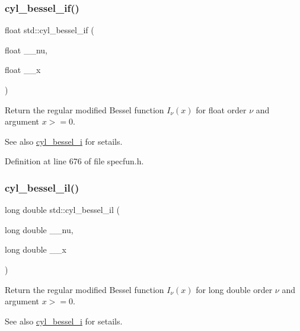 \subsubsection{\texorpdfstring{cyl\+\_\+bessel\+\_\+if()}{cyl\_bessel\_if()}}
{\footnotesize\ttfamily float std\+::cyl\+\_\+bessel\+\_\+if (\begin{DoxyParamCaption}\item[{float}]{\+\_\+\+\_\+nu,  }\item[{float}]{\+\_\+\+\_\+x }\end{DoxyParamCaption})\hspace{0.3cm}{\ttfamily [inline]}}

Return the regular modified Bessel function $ I_{\nu}(x) $ for {\ttfamily float} order $ \nu $ and argument $ x >= 0 $.

\begin{DoxySeeAlso}{See also}
\hyperlink{group__tr29124__math__spec__func_ga29504b6008798072b0b8d6ea5a50ec60}{cyl\+\_\+bessel\+\_\+i} for setails. 
\end{DoxySeeAlso}


Definition at line 676 of file specfun.\+h.

\mbox{\label{group__tr29124__math__spec__func_gab7962629216d03efb8ecaa3f70c6878f}} 
\subsubsection{\texorpdfstring{cyl\+\_\+bessel\+\_\+il()}{cyl\_bessel\_il()}}
{\footnotesize\ttfamily long double std\+::cyl\+\_\+bessel\+\_\+il (\begin{DoxyParamCaption}\item[{long double}]{\+\_\+\+\_\+nu,  }\item[{long double}]{\+\_\+\+\_\+x }\end{DoxyParamCaption})\hspace{0.3cm}{\ttfamily [inline]}}

Return the regular modified Bessel function $ I_{\nu}(x) $ for {\ttfamily long double} order $ \nu $ and argument $ x >= 0 $.

\begin{DoxySeeAlso}{See also}
\hyperlink{group__tr29124__math__spec__func_ga29504b6008798072b0b8d6ea5a50ec60}{cyl\+\_\+bessel\+\_\+i} for setails. 
\end{DoxySeeAlso}


